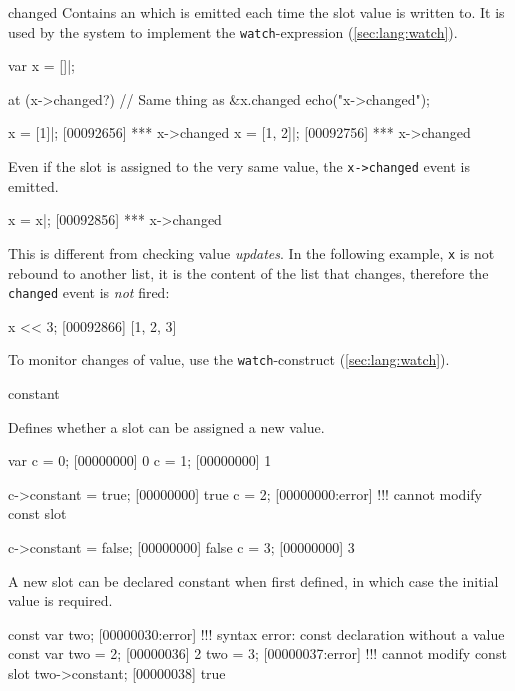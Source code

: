 \begin{urbiscriptapi}

\item[changed]%
  Contains an  which is emitted each time the slot value
  is written to. It is used by the system to implement the
  \lstinline{watch}-expression (\autoref{sec:lang:watch}).

\begin{urbiscript}[firstnumber=1]
var x = []|;

at (x->changed?) // Same thing as &x.changed
  echo("x->changed");

x = [1]|;
[00092656] *** x->changed
x = [1, 2]|;
[00092756] *** x->changed
\end{urbiscript}

Even if the slot is assigned to the very same value, the
\lstinline|x->changed| event is emitted.

\begin{urbiscript}
x = x|;
[00092856] *** x->changed
\end{urbiscript}

This is different from checking value \emph{updates}.  In the following
example, \lstinline{x} is not rebound to another list, it is the content of
the list that changes, therefore the \lstinline{changed} event is \emph{not}
fired:

\begin{urbiscript}
x << 3;
[00092866] [1, 2, 3]
\end{urbiscript}

To monitor changes of value, use the \lstinline{watch}-construct
(\autoref{sec:lang:watch}).



\item[constant]

Defines whether a slot can be assigned a new value.

\begin{urbiscript}
var c = 0;
[00000000] 0
c = 1;
[00000000] 1

c->constant = true;
[00000000] true
c = 2;
[00000000:error] !!! cannot modify const slot

c->constant = false;
[00000000] false
c = 3;
[00000000] 3
\end{urbiscript}

A new slot can be declared constant when first defined, in which case the
initial value is required.

\begin{urbiscript}
const var two;
[00000030:error] !!! syntax error: const declaration without a value
const var two = 2;
[00000036] 2
two = 3;
[00000037:error] !!! cannot modify const slot
two->constant;
[00000038] true
\end{urbiscript}


\end{urbiscriptapi}
